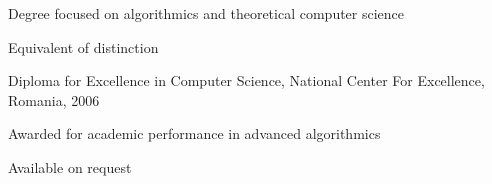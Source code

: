 \documentclass[11pt,article,oneside]{memoir}
\begin{document}
\ind \hspace{0.35in} \footnotesize Degree focused on algorithmics and theoretical computer science\normalsize

\ind \hspace{0.35in} \footnotesize Equivalent of distinction \normalsize

\ind Diploma for Excellence in Computer Science, National Center For Excellence, Romania, \hfill 2006

\ind \hspace{0.35in} \footnotesize Awarded for academic performance in advanced algorithmics \normalsize

\normalsize
\bigskip
{}

\ind Available on request
\end{document}
